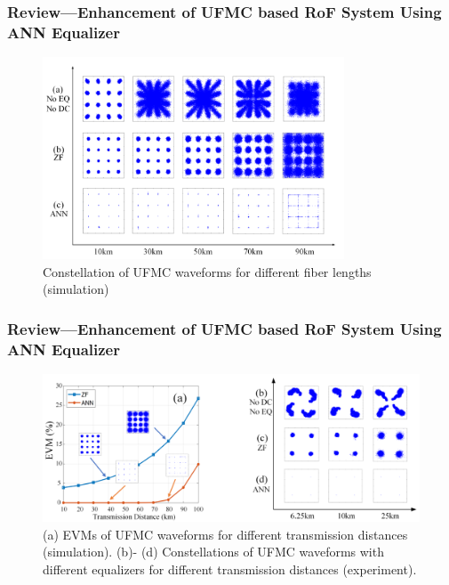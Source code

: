 \documentclass[t]{beamer}
\begin{document}
\begin{frame}
    \frametitle{Review---Enhancement of UFMC based RoF System Using ANN Equalizer~\cite{Liu2019}}
    \begin{figure}
        \includegraphics[width=0.8\textwidth]{ANNEqualizerConstellation.PNG}
        \caption{Constellation of UFMC waveforms for different fiber lengths (simulation)}
    \end{figure}
\end{frame}

\begin{frame}
    \frametitle{Review---Enhancement of UFMC based RoF System Using ANN Equalizer~\cite{Liu2019}}
    \begin{figure}
        \includegraphics[width=\textwidth]{ANNEqualizerResult.PNG}
        \caption{(a) EVMs of UFMC waveforms for different transmission distances (simulation). (b)- (d) Constellations of UFMC waveforms with different equalizers for different transmission distances (experiment).}
    \end{figure}
\end{frame}
\end{document}
